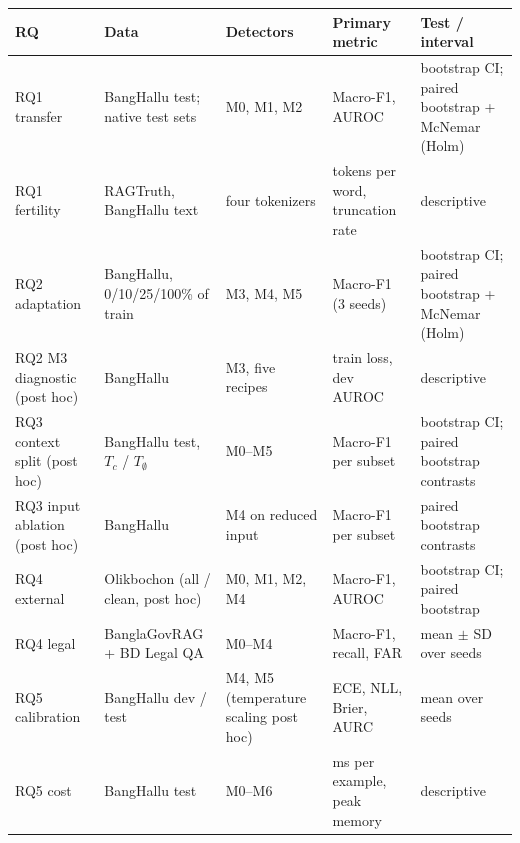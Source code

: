 \begin{tabular}{@{}>{\raggedright}p{2.5cm}>{\raggedright}p{2.7cm}>{\raggedright}p{2.2cm}>{\raggedright}p{2.2cm}>{\raggedright\arraybackslash}p{2.9cm}@{}}
\toprule
RQ & Data & Detectors & Primary metric & Test / interval \tabularnewline
\midrule
RQ1 transfer & BangHallu test; native test sets & M0, M1, M2 & Macro-F1, AUROC & bootstrap CI; paired bootstrap + McNemar (Holm) \tabularnewline
RQ1 fertility & RAGTruth, BangHallu text & four tokenizers & tokens per word, truncation rate & descriptive \tabularnewline
RQ2 adaptation & BangHallu, 0/10/25/100\% of train & M3, M4, M5 & Macro-F1 (3 seeds) & bootstrap CI; paired bootstrap + McNemar (Holm) \tabularnewline
RQ2 M3 diagnostic (post hoc) & BangHallu & M3, five recipes & train loss, dev AUROC & descriptive \tabularnewline
RQ3 context split (post hoc) & BangHallu test, $T_c$ / $T_\emptyset$ & M0--M5 & Macro-F1 per subset & bootstrap CI; paired bootstrap contrasts \tabularnewline
RQ3 input ablation (post hoc) & BangHallu & M4 on reduced input & Macro-F1 per subset & paired bootstrap contrasts \tabularnewline
RQ4 external & Olikbochon (all / clean, post hoc) & M0, M1, M2, M4 & Macro-F1, AUROC & bootstrap CI; paired bootstrap \tabularnewline
RQ4 legal & BanglaGovRAG + BD Legal QA & M0--M4 & Macro-F1, recall, FAR & mean $\pm$ SD over seeds \tabularnewline
RQ5 calibration & BangHallu dev / test & M4, M5 (temperature scaling post hoc) & ECE, NLL, Brier, AURC & mean over seeds \tabularnewline
RQ5 cost & BangHallu test & M0--M6 & ms per example, peak memory & descriptive \tabularnewline
\bottomrule
\end{tabular}
